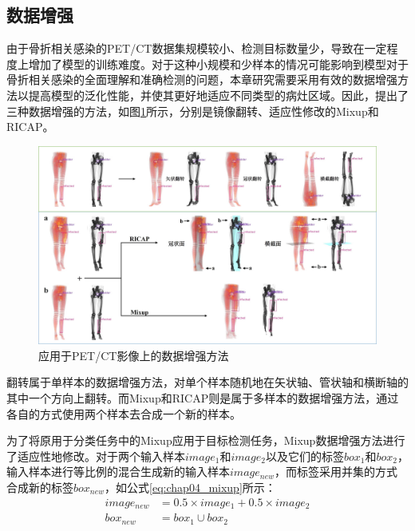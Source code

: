 \subsection{数据增强}

由于骨折相关感染的PET/CT数据集规模较小、检测目标数量少，导致在一定程度上增加了模型的训练难度。对于这种小规模和少样本的情况可能影响到模型对于骨折相关感染的全面理解和准确检测的问题，本章研究需要采用有效的数据增强方法以提高模型的泛化性能，并使其更好地适应不同类型的病灶区域。因此，提出了三种数据增强的方法，如图\ref{fig:chap04_augmentation}所示，分别是镜像翻转、适应性修改的Mixup和RICAP。

\begin{figure}[htbp]
  \centering
  \includegraphics[width=\textwidth]{figures/chap04_augmentation.jpg}
  \caption{应用于PET/CT影像上的数据增强方法}
  \label{fig:chap04_augmentation}
\end{figure}

翻转属于单样本的数据增强方法，对单个样本随机地在矢状轴、管状轴和横断轴的其中一个方向上翻转。而Mixup和RICAP则是属于多样本的数据增强方法，通过各自的方式使用两个样本去合成一个新的样本。

为了将原用于分类任务中的Mixup应用于目标检测任务，Mixup数据增强方法进行了适应性地修改。对于两个输入样本\(image_1\)和\(image_2\)以及它们的标签\(box_1\)和\(box_2\)，输入样本进行等比例的混合生成新的输入样本\(image_{new}\)，而标签采用并集的方式合成新的标签\(box_{new}\)，如公式\ref{eq:chap04_mixup}所示：
\begin{equation}
  \begin{aligned}
    image_{new} & = 0.5 \times image_1 + 0.5 \times image_2 \\
    box_{new}   & = box_1 \cup box_2
  \end{aligned}
  \label{eq:chap04_mixup}
\end{equation}

